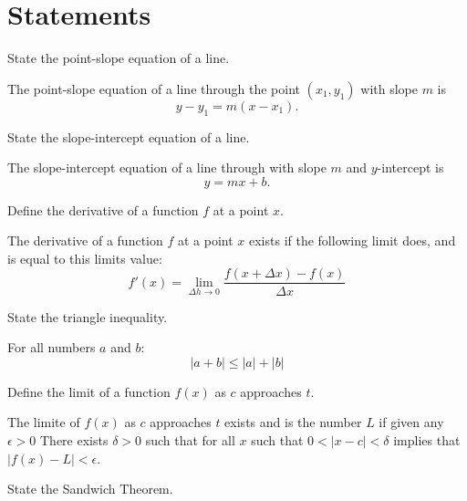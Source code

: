 \section{Statements}
\begin{questions}
    \question[1] State the point-slope equation of a line.
    \begin{solution}
        The point-slope equation of a line through the point $(x_1, y_1)$
        with slope $m$ is $$y - y_1 = m(x - x_1).$$
    \end{solution}

    \question[1] State the slope-intercept equation of a line.
    \begin{solution}
        The slope-intercept equation of a line through with slope $m$
        and $y$-intercept is $$y = mx + b.$$
    \end{solution}

    \question[1] Define the derivative of a function $f$ at a point $x$.
    \begin{solution}
        \begin{definition}
        The derivative of a function $f$ at a point $x$ exists if the
        following limit does, and is equal to this limits value:
        $$f'(x) = \lim_{\Delta h \to 0} \frac{f(x + \Delta x) -
          f(x)}{\Delta x}$$
        \end{definition}
    \end{solution}

    \question[1] State the triangle inequality.
    \begin{solution}
        \begin{theorem}
        For all numbers $a$ and $b$:
        $$|a + b| \le |a| + |b|$$
        \end{theorem}
    \end{solution}

    \question[1] Define the limit of a function $f(x)$ as $c$ approaches
    $t$.
    \begin{solution}%
        \begin{definition} The limite of $f(x)$ as $c$ approaches $t$
        exists and is the number $L$ if given any $\epsilon > 0$ There
        exists $\delta > 0$ such that for all $x$ such that $0 < | x -
        c| < \delta$ implies that $|f(x) - L| < \epsilon$.
        \end{definition}
   
    \end{solution}
    \question[1] State the Sandwich Theorem.
    \begin{solution}


\end{solution}
\end{questions}
